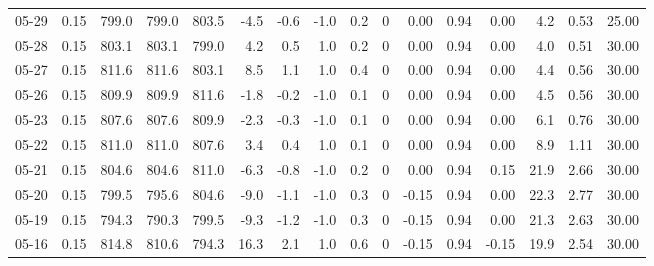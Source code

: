 \begin{threeparttable}
{\begin{tabular}{lrrrrrrrrrrrrrrr}
  05-29 &     0.15 & 799.0 & 799.0 & 803.5 &       -4.5 &           -0.6 &                     -1.0 &                 0.2 &              0 &       0.00 &      0.94 &           0.00 &              4.2 &            0.53 &                  25.00 \\
  05-28 &     0.15 & 803.1 & 803.1 & 799.0 &        4.2 &            0.5 &                      1.0 &                 0.2 &              0 &       0.00 &      0.94 &           0.00 &              4.0 &            0.51 &                  30.00 \\
  05-27 &     0.15 & 811.6 & 811.6 & 803.1 &        8.5 &            1.1 &                      1.0 &                 0.4 &              0 &       0.00 &      0.94 &           0.00 &              4.4 &            0.56 &                  30.00 \\
  05-26 &     0.15 & 809.9 & 809.9 & 811.6 &       -1.8 &           -0.2 &                     -1.0 &                 0.1 &              0 &       0.00 &      0.94 &           0.00 &              4.5 &            0.56 &                  30.00 \\
  05-23 &     0.15 & 807.6 & 807.6 & 809.9 &       -2.3 &           -0.3 &                     -1.0 &                 0.1 &              0 &       0.00 &      0.94 &           0.00 &              6.1 &            0.76 &                  30.00 \\
  05-22 &     0.15 & 811.0 & 811.0 & 807.6 &        3.4 &            0.4 &                      1.0 &                 0.1 &              0 &       0.00 &      0.94 &           0.00 &              8.9 &            1.11 &                  30.00 \\
  05-21 &     0.15 & 804.6 & 804.6 & 811.0 &       -6.3 &           -0.8 &                     -1.0 &                 0.2 &              0 &       0.00 &      0.94 &           0.15 &             21.9 &            2.66 &                  30.00 \\
  05-20 &     0.15 & 799.5 & 795.6 & 804.6 &       -9.0 &           -1.1 &                     -1.0 &                 0.3 &              0 &      -0.15 &      0.94 &           0.00 &             22.3 &            2.77 &                  30.00 \\
  05-19 &     0.15 & 794.3 & 790.3 & 799.5 &       -9.3 &           -1.2 &                     -1.0 &                 0.3 &              0 &      -0.15 &      0.94 &           0.00 &             21.3 &            2.63 &                  30.00 \\
  05-16 &     0.15 & 814.8 & 810.6 & 794.3 &       16.3 &            2.1 &                      1.0 &                 0.6 &              0 &      -0.15 &      0.94 &          -0.15 &             19.9 &            2.54 &                  30.00 \\

\end{tabular}}
\end{threeparttable}

